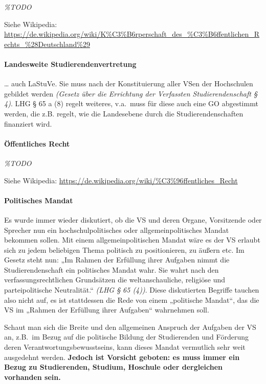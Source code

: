 \documentclass[
10pt,
a4paper,
twoside,								%
titlepage=false,							%
draft=false								%
]{scrartcl}
\begin{document}
\textit{\%TODO}

Siehe Wikipedia: \sloppy \url{https://de.wikipedia.org/wiki/K%C3%B6rperschaft_des_%C3%B6ffentlichen_Rechts_%28Deutschland%29}



\paragraph{Landesweite Studierendenvertretung}

… auch LaStuVe. Sie muss nach der Konstituierung aller VSen der Hochschulen gebildet werden \textit{(Gesetz über die Errichtung der Verfassten Studierendenschaft § 4)}. LHG § 65 a (8) regelt weiteres, v.a.~muss für diese auch eine GO abgestimmt werden, die z.B. regelt, wie die Landesebene durch die Studierendenschaften finanziert wird.



\paragraph{Öffentliches Recht}

\textit{\%TODO}

Siehe Wikipedia: \url{https://de.wikipedia.org/wiki/%C3%96ffentliches_Recht}



\paragraph{Politisches Mandat}

Es wurde immer wieder diskutiert, ob die VS und deren Organe, Vorsitzende oder Sprecher nun ein hochschulpolitisches oder allgemeinpolitisches Mandat bekommen sollen.
Mit einem allgemeinpolitischen Mandat wäre es der VS erlaubt sich zu jedem beliebigen Thema politisch zu positionieren, zu äußern etc.
Im Gesetz steht nun: „Im Rahmen der Erfüllung ihrer Aufgaben nimmt die Studierendenschaft ein politisches Mandat wahr. Sie wahrt nach den verfassungsrechtlichen Grundsätzen die weltanschauliche, religiöse und parteipolitische Neutralität.“ \textit{(LHG § 65 (4))}.
Diese diskutierten Begriffe tauchen also nicht auf, es ist stattdessen die Rede von einem „politische Mandat“, das die VS im „Rahmen der Erfüllung ihrer Aufgaben“ wahrnehmen soll. 

Schaut man sich die Breite und den allgemeinen Anspruch der Aufgaben der VS an, z.B.~im Bezug auf die politische Bildung der Studierenden und Förderung deren Verantwortungsbewusstseins, kann dieses Mandat vermutlich sehr weit ausgedehnt werden. \textbf{Jedoch ist Vorsicht geboten: es muss immer ein Bezug zu Studierenden, Studium, Hoschule oder dergleichen vorhanden sein.}
\end{document}
